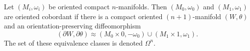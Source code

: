 Let $(M_i, \omega_i)$ be oriented compact $n$-manifolds. Then $(M_0, \omega_0)$ and $(M_1, \omega_1)$ are oriented cobordant if there is a compact oriented $(n+1)$-manifold $(W, \theta)$ and an orientation-preserving diffeomorphism
$$(\partial W, \partial \theta) \approx (M_0 \times 0, -\omega_0) \cup (M_1 \times 1, \omega_1).$$
The set of these equivalence classes is denoted $\Omega^n$.
